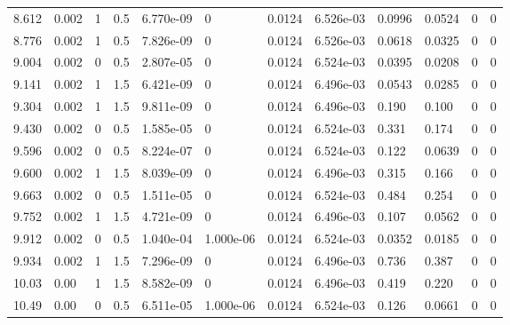 \documentclass[preview]{standalone}
\begin{document}
{{\begin{tabular}{L{1.2cm}C{1.2cm} C{0.3cm}C{0.5cm} C{1.4cm}C{1.4cm} C{1.4cm}C{1.4cm} C{1.6cm}C{1.6cm} C{1.6cm}C{1.6cm}}
  8.612  &  0.002  & 1     & 0.5 &  6.770e-09  & 0  &  0.0124&   6.526e-03& 0.0996 & 0.0524   &  0 & 0  \\ 
  8.776  &  0.002  & 1     & 0.5 &  7.826e-09  & 0  &  0.0124&   6.526e-03& 0.0618 & 0.0325   &  0 & 0  \\ 
  9.004  &  0.002  & 0     & 0.5 &  2.807e-05  & 0  &  0.0124&   6.524e-03& 0.0395 & 0.0208   &  0 & 0  \\ 
  9.141  &  0.002  & 1     & 1.5 &  6.421e-09  & 0  &  0.0124&   6.496e-03& 0.0543 & 0.0285   &  0 & 0  \\ 
  9.304  &  0.002  & 1     & 1.5 &  9.811e-09  & 0  &  0.0124&   6.496e-03& 0.190 & 0.100   &  0 & 0  \\ 
  9.430  &  0.002  & 0     & 0.5 &  1.585e-05  & 0  &  0.0124&   6.524e-03& 0.331 & 0.174   &  0 & 0  \\ 
  9.596  &  0.002  & 0     & 0.5 &  8.224e-07  & 0  &  0.0124&   6.524e-03& 0.122 & 0.0639   &  0 & 0  \\ 
  9.600  &  0.002  & 1     & 1.5 &  8.039e-09  & 0  &  0.0124&   6.496e-03& 0.315 & 0.166   &  0 & 0  \\ 
  9.663  &  0.002  & 0     & 0.5 &  1.511e-05  & 0  &  0.0124&   6.524e-03& 0.484 & 0.254   &  0 & 0  \\ 
  9.752  &  0.002  & 1     & 1.5 &  4.721e-09  & 0  &  0.0124&   6.496e-03& 0.107 & 0.0562   &  0 & 0  \\ 
  9.912  &  0.002  & 0     & 0.5 &  1.040e-04  & 1.000e-06  &  0.0124&   6.524e-03& 0.0352 & 0.0185   &  0 & 0  \\ 
  9.934  &  0.002  & 1     & 1.5 &  7.296e-09  & 0  &  0.0124&   6.496e-03& 0.736 & 0.387   &  0 & 0  \\ 
  10.03  &  0.00  & 1     & 1.5 &  8.582e-09  & 0  &  0.0124&   6.496e-03& 0.419 & 0.220   &  0 & 0  \\ 
  10.49  &  0.00  & 0     & 0.5 &  6.511e-05  & 1.000e-06  &  0.0124&   6.524e-03& 0.126 & 0.0661   &  0 & 0  \\ 
\hline 
\end{tabular} 

}}
\end{document}
